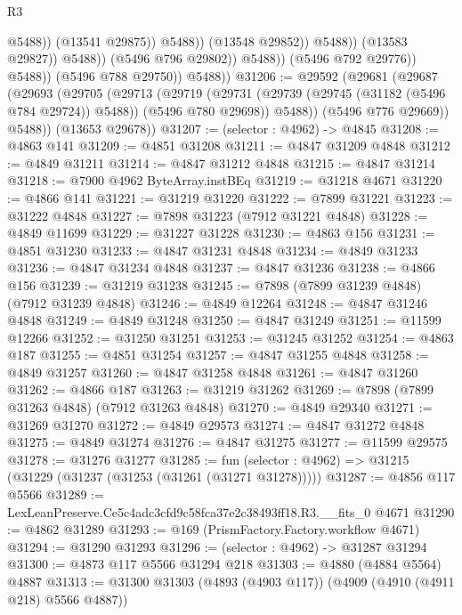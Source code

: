 \begin{lexlean}{R3}
\begin{coremodule}
                                            @5488))
                                        (@13541 @29875))
                                      @5488))
                                  (@13548 @29852))
                                @5488))
                            (@13583 @29827))
                          @5488))
                      (@5496 @796 @29802))
                    @5488))
                (@5496 @792 @29776))
              @5488))
          (@5496 @788 @29750))
        @5488))
@31206 := @29592
    (@29681
      (@29687
        (@29693
          (@29705
            (@29713
              (@29719
                (@29731 (@29739 (@29745 (@31182 (@5496 @784 @29724)) @5488)) (@5496 @780 @29698))
                @5488))
            (@5496 @776 @29669))
          @5488))
      (@13653 @29678))
@31207 := (selector : @4962) -> @4845
@31208 := @4863 @141
@31209 := @4851 @31208
@31211 := @4847 @31209 @4848
@31212 := @4849 @31211
@31214 := @4847 @31212 @4848
@31215 := @4847 @31214
@31218 := @7900 @4962 ByteArray.instBEq
@31219 := @31218 @4671
@31220 := @4866 @141
@31221 := @31219 @31220
@31222 := @7899 @31221
@31223 := @31222 @4848
@31227 := @7898 @31223 (@7912 @31221 @4848)
@31228 := @4849 @11699
@31229 := @31227 @31228
@31230 := @4863 @156
@31231 := @4851 @31230
@31233 := @4847 @31231 @4848
@31234 := @4849 @31233
@31236 := @4847 @31234 @4848
@31237 := @4847 @31236
@31238 := @4866 @156
@31239 := @31219 @31238
@31245 := @7898 (@7899 @31239 @4848) (@7912 @31239 @4848)
@31246 := @4849 @12264
@31248 := @4847 @31246 @4848
@31249 := @4849 @31248
@31250 := @4847 @31249
@31251 := @11599 @12266
@31252 := @31250 @31251
@31253 := @31245 @31252
@31254 := @4863 @187
@31255 := @4851 @31254
@31257 := @4847 @31255 @4848
@31258 := @4849 @31257
@31260 := @4847 @31258 @4848
@31261 := @4847 @31260
@31262 := @4866 @187
@31263 := @31219 @31262
@31269 := @7898 (@7899 @31263 @4848) (@7912 @31263 @4848)
@31270 := @4849 @29340
@31271 := @31269 @31270
@31272 := @4849 @29573
@31274 := @4847 @31272 @4848
@31275 := @4849 @31274
@31276 := @4847 @31275
@31277 := @11599 @29575
@31278 := @31276 @31277
@31285 := fun (selector : @4962) => @31215 (@31229 (@31237 (@31253 (@31261 (@31271 @31278)))))
@31287 := @4856 @117 @5566
@31289 := LexLeanPreserve.Ce5c4adc3cfd9c58fca37e2c38493ff18.R3.__fits_0 @4671
@31290 := @4862 @31289
@31293 := @169 (PrismFactory.Factory.workflow @4671)
@31294 := @31290 @31293
@31296 := (selector : @4962) -> @31287 @31294
@31300 := @4873 @117 @5566 @31294 @218
@31303 := @4880 (@4884 @5564) @4887
@31313 := @31300 @31303 (@4893 (@4903 @117)) (@4909 (@4910 (@4911 @218) @5566 @4887))

\end{coremodule}
\end{lexlean}
